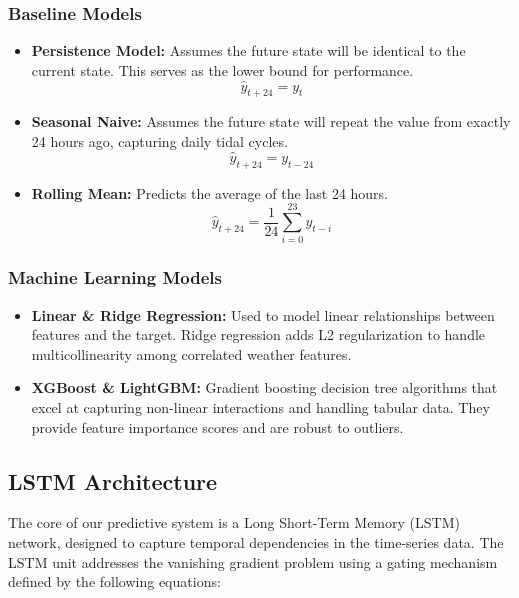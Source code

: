 \subsubsection{Baseline Models}
\begin{itemize}
    \item \textbf{Persistence Model:} Assumes the future state will be identical to the current state. This serves as the lower bound for performance.
    \begin{equation}
        \hat{y}_{t+24} = y_t
    \end{equation}
    
    \item \textbf{Seasonal Naive:} Assumes the future state will repeat the value from exactly 24 hours ago, capturing daily tidal cycles.
    \begin{equation}
        \hat{y}_{t+24} = y_{t-24}
    \end{equation}
    
    \item \textbf{Rolling Mean:} Predicts the average of the last 24 hours.
    \begin{equation}
        \hat{y}_{t+24} = \frac{1}{24}\sum_{i=0}^{23} y_{t-i}
    \end{equation}
\end{itemize}

\subsubsection{Machine Learning Models}
\begin{itemize}
    \item \textbf{Linear \& Ridge Regression:} Used to model linear relationships between features and the target. Ridge regression adds L2 regularization to handle multicollinearity among correlated weather features.
    \item \textbf{XGBoost \& LightGBM:} Gradient boosting decision tree algorithms that excel at capturing non-linear interactions and handling tabular data. They provide feature importance scores and are robust to outliers.
\end{itemize}

\subsection{LSTM Architecture}
The core of our predictive system is a Long Short-Term Memory (LSTM) network, designed to capture temporal dependencies in the time-series data. The LSTM unit addresses the vanishing gradient problem using a gating mechanism defined by the following equations:

